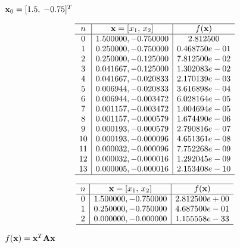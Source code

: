 \documentclass{article}
\def\lthtmlcheckvsize{\ifdim\ht\sizebox<\vsize 
  \ifdim\wd\sizebox<\hsize\expandafter\hfill\fi \expandafter\vfill
  \else\expandafter\vss\fi}%
\begin{document}
{\newpage\clearpage
{}%
$ {\bf x}_0=[1.5,\;-0.75]^T$%
\lthtmlindisplaymathZ
\lthtmlcheckvsize\clearpage}

{\newpage\clearpage
{}%
\begin{displaymath}\begin{array}{c|c|c}\hline
n & {\bf x}=[x_1,\,x_2] & f({\bf x}) \\\hline
0 & 1.500000, -0.750000 & 2.812500 \\
1 & 0.250000, -0.750000 & 0.468750e-01 \\
2 & 0.250000, -0.125000 & 7.812500e-02 \\
3 & 0.041667, -0.125000 & 1.302083e-02 \\
4 & 0.041667, -0.020833 & 2.170139e-03 \\
5 & 0.006944, -0.020833 & 3.616898e-04 \\
6 & 0.006944, -0.003472 & 6.028164e-05 \\
7 & 0.001157, -0.003472 & 1.004694e-05 \\
8 & 0.001157, -0.000579 & 1.674490e-06 \\
9 & 0.000193, -0.000579 & 2.790816e-07 \\
10 & 0.000193, -0.000096 & 4.651361e-08 \\
11 & 0.000032, -0.000096 & 7.752268e-09 \\
12 & 0.000032, -0.000016 & 1.292045e-09 \\
13 & 0.000005, -0.000016 & 2.153408e-10 \\\hline
\end{array}\end{displaymath}%
\lthtmldisplayZ
\lthtmlcheckvsize\clearpage}

{\newpage\clearpage
{}%
\begin{displaymath}\begin{array}{c|c|c}\hline
n & {\bf x}=[x_1,\,x_2] & f({\bf x}) \\\hline
0 & 1.500000, -0.750000 & 2.812500e+00 \\
1 & 0.250000, -0.750000 & 4.687500e-01 \\
2 & 0.000000, -0.000000 & 1.155558e-33 \\\hline
\end{array}\end{displaymath}%
\lthtmldisplayZ
\lthtmlcheckvsize\clearpage}

{\newpage\clearpage
{}%
$ f({\bf x})={\bf x}^T{\bf A}{\bf x}$%
\lthtmlindisplaymathZ
\lthtmlcheckvsize\clearpage}
\end{document}
